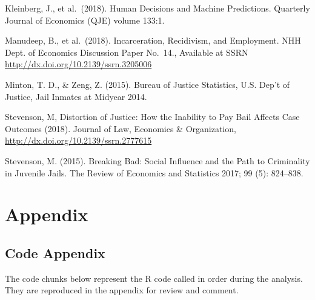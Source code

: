 \documentclass[
  english,
  man]{apa6}
\begin{document}
Kleinberg, J., et al.~(2018). Human Decisions and Machine Predictions. Quarterly Journal of Economics (QJE)
volume 133:1.

Manudeep, B., et al.~(2018). Incarceration, Recidivism, and Employment. NHH Dept. of Economics Discussion Paper No.~14., Available at SSRN \url{http://dx.doi.org/10.2139/ssrn.3205006}

Minton, T. D., \& Zeng, Z. (2015). Bureau of Justice Statistics, U.S. Dep't of Justice,
Jail Inmates at Midyear 2014.

Stevenson, M, Distortion of Justice: How the Inability to Pay Bail Affects Case Outcomes (2018).
Journal of Law, Economics \& Organization,
\url{http://dx.doi.org/10.2139/ssrn.2777615}

Stevenson, M. (2015). Breaking Bad: Social Influence and the Path to Criminality in Juvenile Jails.
The Review of Economics and Statistics 2017; 99 (5): 824--838.

\hypertarget{refs}{}

\endgroup

\clearpage

\hypertarget{appendix}{%
\section{Appendix}\label{appendix}}

\hypertarget{code-appendix}{%
\subsection{Code Appendix}\label{code-appendix}}

The code chunks below represent the R code called in order during the analysis.
They are reproduced in the appendix for review and comment.
\end{document}
